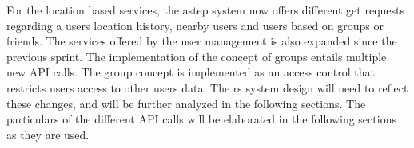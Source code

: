 For the location based services, the \gls{astep} system now offers different get requests regarding a users location history, nearby users and users based on groups or friends.
The services offered by the user management is also expanded since the previous sprint. 
The implementation of the concept of groups entails multiple new API calls. 
The group concept is implemented as an access control that restricts users access to other users data.
The \gls{rs} system design will need to reflect these changes, and will be further analyzed in the following sections.  
The particulars of the different API calls will be elaborated in the following sections as they are used.